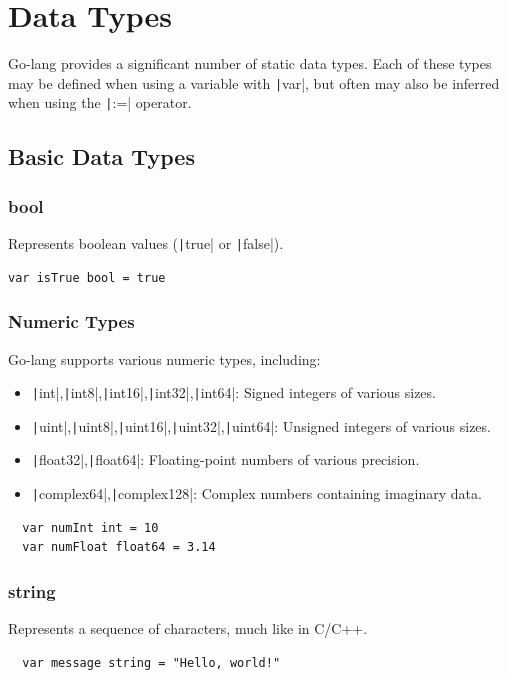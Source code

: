 \documentclass[letterpaper,12pt]{article}
\begin{document}
\section{Data Types}
Go-lang provides a significant number of static data types. Each of these types may be defined when using a variable with \texttt|var|, but often may also be inferred when using the \texttt|:=| operator.
\subsection{Basic Data Types}
\subsubsection*{bool}
Represents boolean values (\texttt|true| or \texttt|false|).
\begin{verbatim}
var isTrue bool = true  
\end{verbatim}
\subsubsection*{Numeric Types}
Go-lang supports various numeric types, including:

\begin{itemize}
  \item \texttt|int|,\texttt|int8|,\texttt|int16|,\texttt|int32|,\texttt|int64|: Signed integers of various sizes.
  \item \texttt|uint|,\texttt|uint8|,\texttt|uint16|,\texttt|uint32|,\texttt|uint64|: Unsigned integers of various sizes.
  \item \texttt|float32|,\texttt|float64|: Floating-point numbers of various precision.
  \item \texttt|complex64|,\texttt|complex128|: Complex numbers containing imaginary data.
\end{itemize}
\begin{verbatim}
  var numInt int = 10
  var numFloat float64 = 3.14  
\end{verbatim}
\subsubsection*{string}
Represents a sequence of characters, much like in C/C++.
\begin{verbatim}
  var message string = "Hello, world!"   
\end{verbatim}
\end{document}
